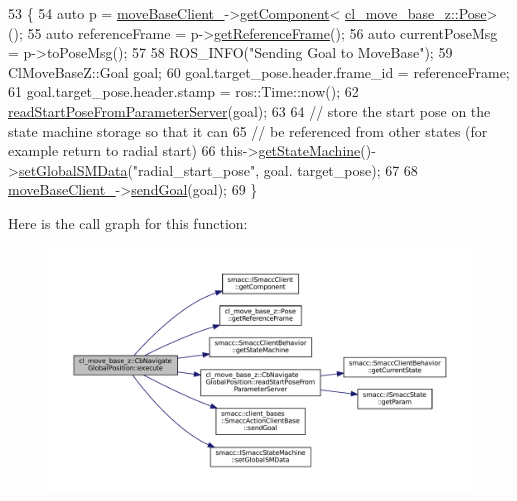 \begin{DoxyCode}
53     \{
54         \textcolor{keyword}{auto} p = \hyperlink{classcl__move__base__z_1_1CbNavigateGlobalPosition_a460d6b43834cb52baa94d22cd3a6fd2b}{moveBaseClient\_}->\hyperlink{classsmacc_1_1ISmaccClient_adef78db601749ca63c19e74a27cb88cc}{getComponent}<
      \hyperlink{classcl__move__base__z_1_1Pose}{cl\_move\_base\_z::Pose}>();
55         \textcolor{keyword}{auto} referenceFrame = p->\hyperlink{classcl__move__base__z_1_1Pose_af8c2dc151e74aa8da6b283d1c8563051}{getReferenceFrame}();
56         \textcolor{keyword}{auto} currentPoseMsg = p->toPoseMsg();
57 
58         ROS\_INFO(\textcolor{stringliteral}{"Sending Goal to MoveBase"});
59         ClMoveBaseZ::Goal goal;
60         goal.target\_pose.header.frame\_id = referenceFrame;
61         goal.target\_pose.header.stamp = ros::Time::now();
62         \hyperlink{classcl__move__base__z_1_1CbNavigateGlobalPosition_a868b25f238e3781c9a2e44b4e1502fcc}{readStartPoseFromParameterServer}(goal);
63 
64         \textcolor{comment}{// store the start pose on the state machine storage so that it can}
65         \textcolor{comment}{// be referenced from other states (for example return to radial start)}
66         this->\hyperlink{classsmacc_1_1SmaccClientBehavior_aa817da149f366f6a28794c04eb0744b0}{getStateMachine}()->\hyperlink{classsmacc_1_1ISmaccStateMachine_a8588f9e580fbb95b53e2bd2ca3ff1f98}{setGlobalSMData}(\textcolor{stringliteral}{"radial\_start\_pose"}, goal.
      target\_pose);
67 
68         \hyperlink{classcl__move__base__z_1_1CbNavigateGlobalPosition_a460d6b43834cb52baa94d22cd3a6fd2b}{moveBaseClient\_}->\hyperlink{classsmacc_1_1client__bases_1_1SmaccActionClientBase_a9c47a5094ac8afb01680307fe5eca922}{sendGoal}(goal);
69     \}
\end{DoxyCode}
Here is the call graph for this function\+:
\nopagebreak
\begin{figure}[H]
\begin{center}
\leavevmode
\includegraphics[width=350pt]{classcl__move__base__z_1_1CbNavigateGlobalPosition_a0b8525ea9e4388b27cb1f9b1e06a3b63_cgraph}
\end{center}
\end{figure}
